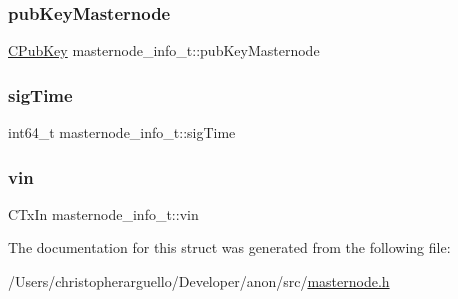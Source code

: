 \subsubsection{\texorpdfstring{pub\+Key\+Masternode}{pubKeyMasternode}}
{\footnotesize\ttfamily \mbox{\hyperlink{class_c_pub_key}{C\+Pub\+Key}} masternode\+\_\+info\+\_\+t\+::pub\+Key\+Masternode}

\mbox{\label{structmasternode__info__t_a6cb66488a4dbecd5630dad10d3a4375e}} 
\subsubsection{\texorpdfstring{sig\+Time}{sigTime}}
{\footnotesize\ttfamily int64\+\_\+t masternode\+\_\+info\+\_\+t\+::sig\+Time}

\mbox{\label{structmasternode__info__t_a55ac644d701067dfa6123ae19e0301c8}} 
\subsubsection{\texorpdfstring{vin}{vin}}
{\footnotesize\ttfamily C\+Tx\+In masternode\+\_\+info\+\_\+t\+::vin}



The documentation for this struct was generated from the following file\+:\begin{DoxyCompactItemize}
\item 
/\+Users/christopherarguello/\+Developer/anon/src/\mbox{\hyperlink{masternode_8h}{masternode.\+h}}\end{DoxyCompactItemize}
